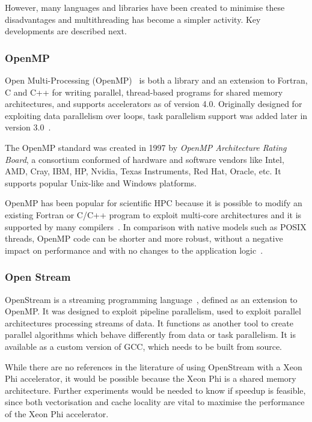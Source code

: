 However, many languages and libraries have been created to minimise these disadvantages and multithreading has become a simpler activity. Key developments are described next.

\subsubsection{OpenMP}

Open Multi-Processing (OpenMP)~\cite{dagum1998openmp} is both a library and an extension to Fortran, C and C++ for writing parallel, thread-based programs for shared memory architectures, and supports accelerators as of version 4.0\cite{openmp13}. Originally designed for exploiting data parallelism over loops, task parallelism support was added later in version 3.0~\cite{tousimojarad2014comparison}.

The OpenMP standard was created in 1997 by \textit{OpenMP Architecture Rating Board}, a consortium conformed of hardware and software vendors like Intel, AMD, Cray, IBM, HP, Nvidia, Texas Instruments, Red Hat, Oracle, etc. It supports popular Unix-like and Windows platforms.

OpenMP has been popular for scientific HPC because it is possible to modify an existing Fortran or C/C++ program to exploit multi-core architectures and it is supported by many compilers~\cite{2_openmp.org_2015}. In comparison with native models such as POSIX threads\cite{mueller1993library}, OpenMP code can be shorter and more robust, without a negative impact on performance and with no changes to the application logic~\cite{kuhn2000openmp}.

\subsubsection{Open Stream}

OpenStream is a streaming programming language~\cite{pop2013openstream}, defined as an extension to OpenMP. It was designed to exploit pipeline parallelism, used to exploit parallel architectures processing streams of data. It functions as another tool to create parallel algorithms which behave differently from data or task parallelism. It is available as a custom version of GCC, which needs to be built from source.

While there are no references in the literature of using OpenStream with a Xeon Phi accelerator, it would be possible because the Xeon Phi is a shared memory architecture. Further experiments would be needed to know if speedup is feasible, since both vectorisation and cache locality are vital to maximise the performance of the Xeon Phi accelerator\cite{7_software.intel.com_2014}.

